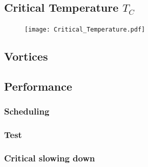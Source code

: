 \subsection{Critical Temperature $T_C$}
\begin{figure}[H]
	\centering
	\texttt{[image: Critical\_Temperature.pdf]}
\end{figure}

\subsection{Vortices}

\subsection{Performance}
\subsubsection{Scheduling}

\subsubsection{Test}

\subsubsection{Critical slowing down}